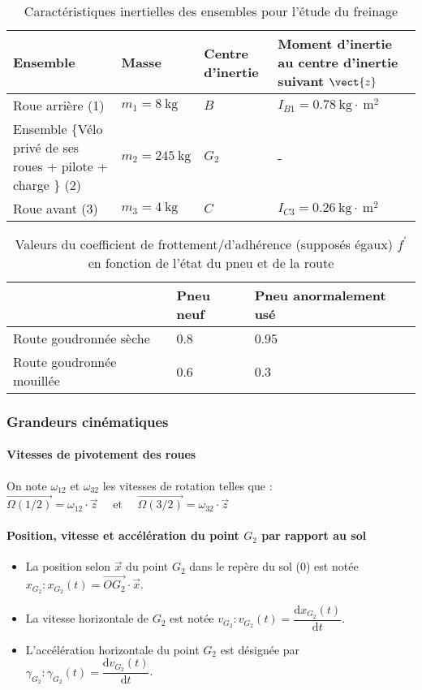\begin{table}[!h]
\centering
\begin{tabular}{p{4cm}p{3cm}p{3cm}p{4cm}}
\hline
\textbf{Ensemble} & \textbf{Masse} & \textbf{Centre d'inertie}&\textbf{Moment d'inertie au centre d'inertie suivant } $\vect{z}$ \\
\hline
Roue arrière (1) & \(m_{1}=8 \mathrm{~kg}\) & \(B\) & \(I_{B 1}=0.78 \mathrm{~kg} \cdot \mathrm{~m}^{2}\) \\
Ensemble \{Vélo privé de ses roues + pilote + charge \} (2)  & \(m_{2}=245 \mathrm{~kg}\) & \(G_{2}\) & - \\
Roue avant (3) & \(m_{3}=4 \mathrm{~kg}\) & \(C\) & \(I_{C 3}=0.26 \mathrm{~kg} \cdot \mathrm{~m}^{2}\) \\
\hline
\end{tabular}
\caption{ Caractéristiques inertielles des ensembles pour l'étude du freinage \label{tab_32}}
\end{table}


\begin{table}[!h]
\centering
\begin{tabular}{lll}
 & \textbf{Pneu neuf} & \textbf{Pneu anormalement usé} \\
\hline
Route goudronnée sèche & 0.8 & 0.95 \\
Route goudronnée mouillée & 0.6 & 0.3 \\
\hline
\end{tabular}
\caption{Valeurs du coefficient de frottement/d'adhérence (supposés égaux) \(f^{\prime}\) en fonction de l'état du pneu et de la route \label{tab_33}}
\end{table}


\subsubsection{Grandeurs cinématiques}
\paragraph*{Vitesses de pivotement des roues} On note \(\omega_{12}\) et \(\omega_{32}\) les vitesses de rotation telles que :
$
\overrightarrow{\Omega(1 / 2)}=\omega_{12} \cdot \vec{z} \quad \text { et } \quad \overrightarrow{\Omega(3 / 2)}=\omega_{32} \cdot \vec{z}
$

\paragraph*{Position, vitesse et accélération du point \(G_{2}\) par rapport au sol}
\begin{itemize}
\item La position selon \(\vec{x}\) du point \(G_{2}\) dans le repère du sol (0) est notée \(x_{G_{2}}: x_{G_{2}}(t)=\overrightarrow{O G_{2}} \cdot \vec{x}\).
  \item La vitesse horizontale de \(G_{2}\) est notée \(v_{G_{2}}: v_{G_{2}}(t)=\dfrac{\mathrm{d} x_{G_{2}}(t)}{\mathrm{d} t}\).
  \item L'accélération horizontale du point \(G_{2}\) est désignée par \(\gamma_{G_{2}}: \gamma_{G_{2}}(t)=\dfrac{\mathrm{d} v_{G_{2}}(t)}{\mathrm{d} t}\).
\end{itemize}
\fi

